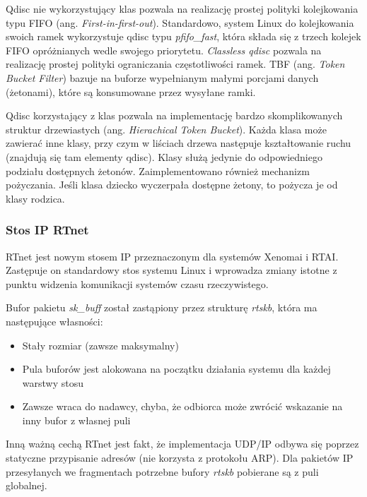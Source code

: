 Qdisc nie wykorzystujący klas pozwala na realizację prostej polityki kolejkowania typu FIFO (ang. \emph{First-in-first-out}). Standardowo, system Linux do kolejkowania swoich ramek wykorzystuje qdisc typu \emph{pfifo\_fast}, która składa się z trzech kolejek FIFO opróżnianych wedle swojego priorytetu. \emph{Classless qdisc} pozwala na realizację prostej polityki ograniczania częstotliwości ramek. TBF (ang. \emph{Token Bucket Filter}) bazuje na buforze wypełnianym małymi porcjami danych (żetonami), które są konsumowane przez wysyłane ramki.

Qdisc korzystający z klas pozwala na implementację bardzo skomplikowanych struktur drzewiastych (ang. \emph{Hierachical Token Bucket}). Każda klasa może zawierać inne klasy, przy czym w liściach drzewa następuje kształtowanie ruchu (znajdują się tam elementy qdisc). Klasy służą jedynie do odpowiedniego podziału dostępnych żetonów. Zaimplementowano również mechanizm pożyczania. Jeśli klasa dziecko wyczerpała dostępne żetony, to pożycza je od klasy rodzica.

\subsubsection{Stos IP RTnet}

RTnet jest nowym stosem IP przeznaczonym dla systemów Xenomai i RTAI. Zastępuje on standardowy stos systemu Linux i wprowadza zmiany istotne z punktu widzenia komunikacji systemów czasu rzeczywistego.

Bufor pakietu \emph{sk\_buff} został zastąpiony przez strukturę \emph{rtskb}, która ma następujące własności:

\begin{itemize}
\item Stały rozmiar (zawsze maksymalny)
\item Pula buforów jest alokowana na początku działania systemu dla każdej warstwy stosu
\item Zawsze wraca do nadawcy, chyba, że odbiorca może zwrócić wskazanie na inny bufor z własnej puli
\end{itemize}

Inną ważną cechą RTnet jest fakt, że implementacja UDP/IP odbywa się poprzez statyczne przypisanie adresów (nie korzysta z protokołu ARP). Dla pakietów IP przesyłanych we fragmentach potrzebne bufory \emph{rtskb} pobierane są z puli globalnej.


